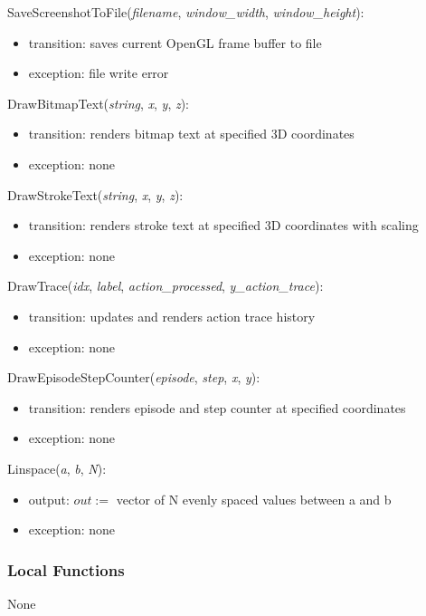 \documentclass[12pt, titlepage]{article}
\begin{document}
\noindent SaveScreenshotToFile(\textit{filename}, \textit{window\_width}, \textit{window\_height}):
\begin{itemize}
\item transition: saves current OpenGL frame buffer to file
\item exception: file write error
\end{itemize}

\noindent DrawBitmapText(\textit{string}, \textit{x}, \textit{y}, \textit{z}):
\begin{itemize}
\item transition: renders bitmap text at specified 3D coordinates
\item exception: none
\end{itemize}

\noindent DrawStrokeText(\textit{string}, \textit{x}, \textit{y}, \textit{z}):
\begin{itemize}
\item transition: renders stroke text at specified 3D coordinates with scaling
\item exception: none
\end{itemize}

\noindent DrawTrace(\textit{idx}, \textit{label}, \textit{action\_processed}, \textit{y\_action\_trace}):
\begin{itemize}
\item transition: updates and renders action trace history
\item exception: none
\end{itemize}

\noindent DrawEpisodeStepCounter(\textit{episode}, \textit{step}, \textit{x}, \textit{y}):
\begin{itemize}
\item transition: renders episode and step counter at specified coordinates
\item exception: none
\end{itemize}

\noindent Linspace(\textit{a}, \textit{b}, \textit{N}):
\begin{itemize}
\item output: $out := $ vector of N evenly spaced values between a and b
\item exception: none
\end{itemize}

\subsubsection{Local Functions}
None
\end{document}
